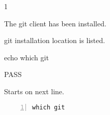 \begin{description}[align=right,leftmargin=3.2cm,labelindent=3.0cm]
\item[Step:] 1
\item[Confirm:] The git client has been installed.
\item[Expectation:] git installation location is listed.
\item[Command:] echo which  git
\item[Test Result:] PASS
\item[Evidence:] Starts on next line.
\end{description}
\begin{lstlisting}[numbers=left]
which git

\end{lstlisting}
